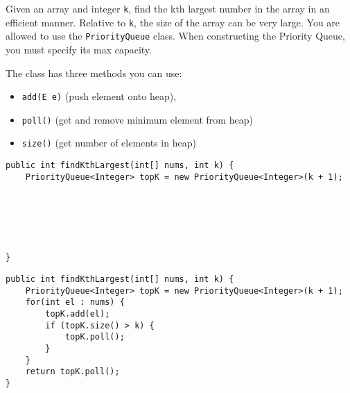 \begin{blocksection}
\question Given an array and integer \lstinline$k$, find the kth largest number in the array in an efficient manner. Relative to \lstinline$k$, the size of the array can be very large.
You are allowed to use the \lstinline$PriorityQueue$ class. When constructing the Priority Queue, you must specify its max capacity.

The class has three methods you can use:
\begin{itemize}
    \item\lstinline$add(E e)$ (push element onto heap), 
    \item\lstinline$poll()$ (get and remove minimum element from heap) 
    \item\lstinline$size()$ (get number of elements in heap)
\end{itemize}

\begin{lstlisting}
public int findKthLargest(int[] nums, int k) {
    PriorityQueue<Integer> topK = new PriorityQueue<Integer>(k + 1);






}
\end{lstlisting}



\begin{solution}
\begin{lstlisting}
public int findKthLargest(int[] nums, int k) {
    PriorityQueue<Integer> topK = new PriorityQueue<Integer>(k + 1);
    for(int el : nums) {
        topK.add(el);
        if (topK.size() > k) {
            topK.poll();
        }
    }
    return topK.poll();
}

\end{lstlisting}
\end{solution}
\end{blocksection}
